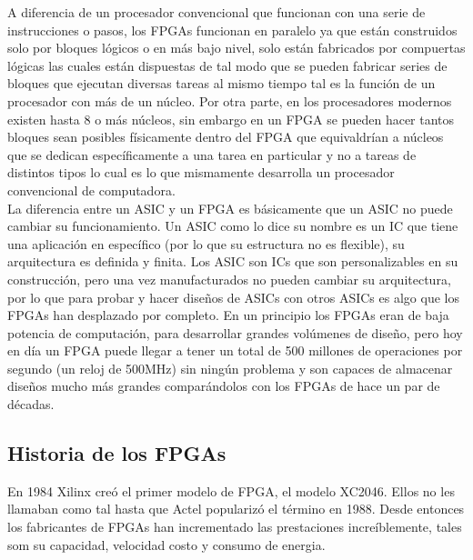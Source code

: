 \documentclass[twoside,spanish,ESP,MSc]{plantillaLabUPV}
\theoremstyle{definition}
\newcommand{\f}{FPGA }
\newcommand{\fs}{FPGAs }
\begin{document}
A diferencia de un procesador convencional que funcionan con una serie de instrucciones o pasos, los \fs funcionan en paralelo ya que están construidos solo por bloques lógicos o en más bajo nivel, solo están fabricados por compuertas lógicas las cuales están dispuestas de tal modo que se pueden fabricar series de bloques que ejecutan diversas tareas al mismo tiempo tal es la función de un procesador con más de un núcleo. Por otra parte, en los procesadores modernos existen hasta 8 o más núcleos, sin embargo en un \f se pueden hacer tantos bloques sean posibles físicamente dentro del \f que equivaldrían a núcleos que se dedican específicamente a una tarea en particular y no a tareas de distintos tipos lo cual es lo que mismamente desarrolla un procesador convencional de computadora. \\



La diferencia entre un ASIC y un \f es básicamente que un ASIC no puede cambiar su funcionamiento. Un ASIC como lo dice su nombre es un IC que tiene una aplicación en específico (por lo que su estructura no es flexible), su arquitectura es definida y finita. Los ASIC son ICs que son personalizables en su construcción, pero una vez manufacturados no pueden cambiar su arquitectura, por lo que para probar y hacer diseños de ASICs con otros ASICs es algo que los \fs han desplazado por completo. En un principio los \fs eran de baja potencia de computación, para desarrollar grandes volúmenes de diseño, pero hoy en día un \f puede llegar a tener un total de 500 millones de operaciones por segundo (un reloj de 500MHz) sin ningún problema y son capaces de almacenar diseños mucho más grandes comparándolos con los \fs de hace un par de décadas.

\subsection{Historia de los FPGAs}
En 1984 Xilinx creó el primer modelo de FPGA, el modelo XC2046. Ellos no les llamaban como tal hasta que Actel popularizó el término en 1988. Desde entonces los fabricantes de \fs han incrementado las prestaciones increíblemente, tales som su capacidad, velocidad costo y consumo de energia.
\end{document}
